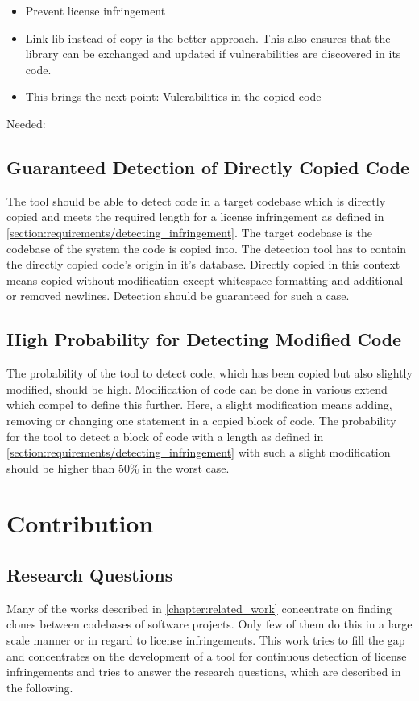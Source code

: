 \begin{itemize}
	\item Prevent license infringement
	\item Link lib instead of copy is the better approach. This also ensures that the library can be exchanged and updated if vulnerabilities are discovered in its code.
	\item This brings the next point: Vulerabilities in the copied code
\end{itemize}

Needed:

\subsection{Guaranteed Detection of Directly Copied Code}\label{section:requirements/guaranteed_detection}
The tool should be able to detect code in a target codebase which is directly copied and meets the required length for a license infringement as defined in \autoref{section:requirements/detecting_infringement}.
The target codebase is the codebase of the system the code is copied into.
The detection tool has to contain the directly copied code's origin in it's database.
Directly copied in this context means copied without modification except whitespace formatting and additional or removed newlines.
Detection should be guaranteed for such a case.

\subsection{High Probability for Detecting Modified Code}\label{section:requirements/high_probability}
The probability of the tool to detect code, which has been copied but also slightly modified, should be high.
Modification of code can be done in various extend which compel to define this further.
Here, a slight modification means adding, removing or changing one statement in a copied block of code.
The probability for the tool to detect a block of code with a length as defined in \autoref{section:requirements/detecting_infringement} with such a slight modification should be higher than 50\% in the worst case. %


\section{Contribution}
\subsection*{Research Questions}\label{section:introduction/research_questions}
Many of the works described in \autoref{chapter:related_work} concentrate on finding clones between codebases of software projects.
Only few of them do this in a large scale manner or in regard to license infringements.
This work tries to fill the gap and concentrates on the development of a tool for continuous detection of license infringements and tries to answer the research questions, which are described in the following.

